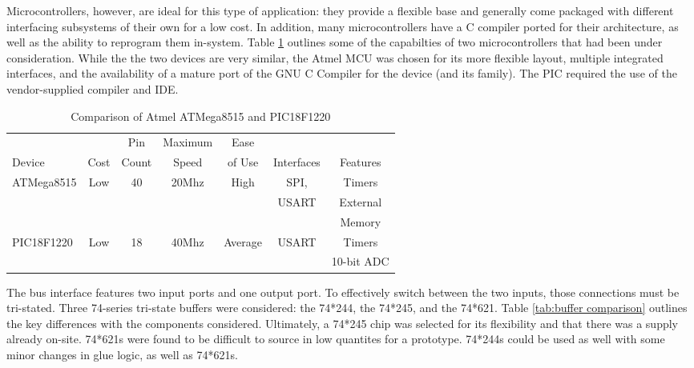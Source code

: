 Microcontrollers, however, are ideal for this type of application: they provide a flexible base and 
generally come packaged with different interfacing subsystems of their own for a low cost. In addition, 
many microcontrollers have a C compiler ported for their architecture, as well as the ability to 
reprogram them in-system. Table \ref{tab:MCU capabilities} outlines some of the capabilties of 
two microcontrollers that had been under consideration. While the the two devices are very similar, 
the Atmel MCU was chosen for its more flexible layout, multiple integrated interfaces, and the 
availability of a mature port of the GNU C Compiler for the device (and its family). The PIC required
the use of the vendor-supplied compiler and IDE.
\begin{table}[bhp]
\caption[Atmel and PIC MCUs]{Comparison of Atmel ATMega8515 and PIC18F1220}
\begin{tabular}{l| c c c c c c}
\setlength{\tabcolsep}{1pt}
	       &      & \small{Pin}  & \small{Maximum} & \small{Ease}   &            &         \\
	\small{Device} & \small{Cost} & \small{Count} & \small{Speed}  & \small{of Use} 
	& \small{Interfaces} & \small{Features}\\\hline
	\multirow{3}{*}{\small{ATMega8515}} & \multirow{3}{*}{\small{Low}} & \multirow{3}{*}{\small{40}}
	& \multirow{3}{*}{\small{20Mhz}} & \small{High} 
	& \small{SPI,} & \small{Timers}\\
	           &     &    &       &      &\small{USART} & \small{External}\\
	& & & & & &\small{Memory}\\\hline
	\small{PIC18F1220} & \small{Low} & \small{18} & \small{40Mhz} & \small{Average} & 
	\small{USART} & \small{Timers} \\
	           &     &    &       &      &  & \small{10-bit ADC}\\
\end{tabular}
\label{tab:MCU capabilities}
\end{table}

The bus interface features two input ports and one output port. To effectively switch between the 
two inputs, those connections must be tri-stated. Three 74-series tri-state buffers were considered: 
the 74*244, the 74*245, and the 74*621. Table \ref{tab:buffer comparison} outlines the key differences
with the components considered. Ultimately, a 74*245 chip was selected for its flexibility and that there was a supply already on-site. 74*621s were found to be difficult to source in low quantites for a prototype. 74*244s could be used as well with some minor changes in glue logic, as well as 74*621s.

